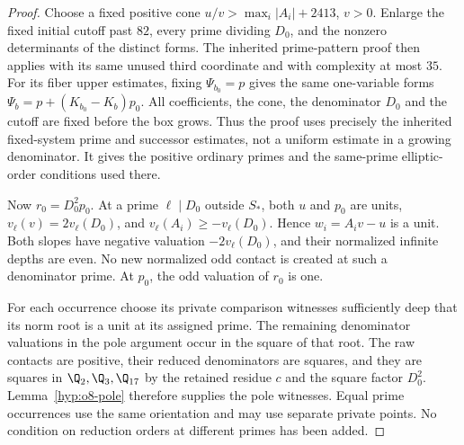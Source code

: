 \begin{proof}
Choose a fixed positive cone
$u/v>\max_i|A_i|+2413$, $v>0$. Enlarge the fixed initial cutoff past
$82$, every prime dividing $D_0$, and the nonzero determinants of the
distinct forms. The inherited prime-pattern proof then applies with its
same unused third coordinate and with complexity at most $35$.
For its fiber upper estimates, fixing $\Psi_{b_0}=p$ gives the same
one-variable forms
$\Psi_b=p+(K_{b_0}-K_b)p_0$.
All coefficients, the cone, the denominator $D_0$ and the cutoff are
fixed before the box grows. Thus the proof uses precisely the inherited
fixed-system prime and successor estimates, not a uniform estimate in a
growing denominator. It gives the positive ordinary primes and the
same-prime elliptic-order conditions used there.

Now $r_0=D_0^2p_0$. At a prime $\ell\mid D_0$ outside $S_*$, both $u$
and $p_0$ are units, $v_\ell(v)=2v_\ell(D_0)$, and
$v_\ell(A_i)\ge-v_\ell(D_0)$. Hence $w_i=A_iv-u$ is a unit.
Both slopes have negative valuation $-2v_\ell(D_0)$, and their normalized
infinite depths are even. No new normalized odd contact is created at
such a denominator prime. At $p_0$, the odd valuation of $r_0$ is one.

For each occurrence choose its private comparison witnesses sufficiently
deep that its norm root is a unit at its assigned prime. The remaining
denominator valuations in the pole argument occur in the square of that
root. The raw contacts are positive, their reduced denominators are
squares, and they are squares in $\Q_2,\Q_3,\Q_{17}$ by the retained
residue $c$ and the square factor $D_0^2$. Lemma~\ref{hyp:o8-pole}
therefore supplies the pole witnesses. Equal prime occurrences use the
same orientation and may use separate private points. No condition on
reduction orders at different primes has been added.
\end{proof}

